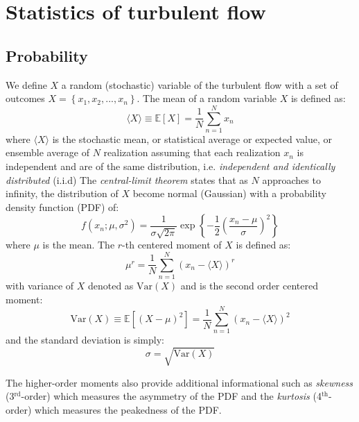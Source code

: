 \chapter{Statistics of turbulent flow}
\label{app:statistics}

\section*{Probability}

We define $X$ a random (stochastic) variable of the turbulent flow with a set of outcomes $X = \left\{x_1, x_2, ..., x_n\right\}$. The mean of a random variable $X$ is defined as:
\begin{equation}
{\langle X \rangle} \equiv \mathbb{E} \left[X \right] = \frac{1}{N} \sum_{n=1}^{N} x_{n}
\end{equation}
where $\langle X \rangle$ is the stochastic mean, or statistical average or expected value, or ensemble average \citep{Sagaut,Pope} of $N$ realization assuming that each realization $x_n$ is independent and are of the same distribution, i.e. \textit{independent and identically distributed} (i.i.d)  The \textit{central-limit theorem} states that as $N$ approaches to infinity, the distribution of $X$ become normal (Gaussian) with a probability density function (PDF) of:
\begin{equation}
f(x_n;\mu, \sigma^2) = \frac{1}{\sigma \sqrt{2\pi}} \exp \left\{ -\frac{1}{2} \left(\frac{x_n - \mu}{\sigma}\right)^2 \right\}
\end{equation}
where $\mu$ is the mean. The $r$-th centered moment of $X$ is defined as:
\begin{equation}
\mu^r = \frac{1}{N} \sum_{n=1}^{N} \left( x_n - \langle X \rangle\right)^r
\end{equation}
with variance of $X$ denoted as $\mathrm{Var}\left(X\right)$ and is the second order centered moment:
\begin{equation}
\mathrm{Var}\left(X\right)\equiv \mathbb{E} \left[ \left(X - \mu\right)^2 \right] = \frac{1}{N} \sum_{n=1}^{N} \left( x_n - \langle X \rangle\right)^2
\end{equation}
and the standard deviation is simply:
\begin{equation}
\sigma = \sqrt{ \mathrm{Var}\left(X\right) }
\end{equation}

The higher-order moments also provide additional informational such as \textit{skewness} (3$^{\mathrm{rd}}$-order) which measures the asymmetry of the PDF and the \textit{kurtosis} (4$^{\mathrm{th}}$-order) which measures the peakedness of the PDF.

